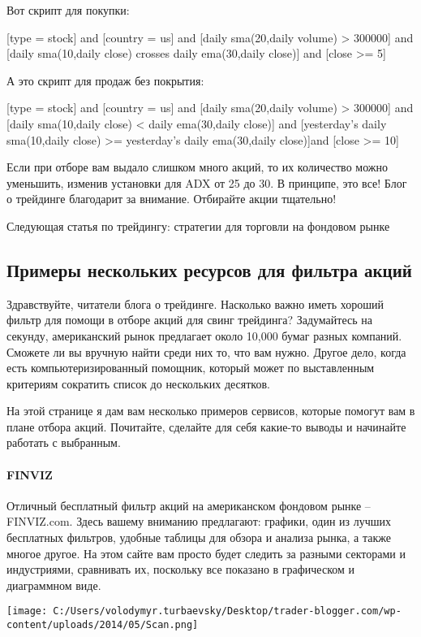 \documentclass[a5paper]{article}
\begin{document}
Вот скрипт для покупки:

[type = stock] and [country = us] and [daily sma(20,daily volume) > 300000] and
[daily sma(10,daily close) crosses daily ema(30,daily close)] and
[close >= 5]

А это скрипт для продаж без покрытия:

[type = stock] and [country = us] and [daily sma(20,daily volume) > 300000] and
[daily sma(10,daily close) < daily ema(30,daily close)] and
[yesterday's daily sma(10,daily close) >= yesterday's daily ema(30,daily close)]and
[close >= 10]

Если при отборе вам выдало слишком много акций, то их количество можно уменьшить, изменив установки для ADX от 25 до 30. В принципе, это все! Блог о трейдинге благодарит за внимание. Отбирайте акции тщательно!


Следующая статья по трейдингу: стратегии для торговли на фондовом
рынке

\subsection{Примеры нескольких ресурсов для фильтра акций}

Здравствуйте, читатели блога о трейдинге. Насколько важно иметь хороший фильтр для помощи в отборе акций для свинг трейдинга? Задумайтесь на секунду, американский рынок предлагает около 10,000 бумаг разных компаний. Сможете ли вы вручную найти среди них то, что вам нужно. Другое дело, когда есть компьютеризированный помощник, который может по выставленным критериям сократить список до нескольких десятков.

На этой странице я дам вам несколько примеров сервисов, которые
помогут вам в плане отбора акций. Почитайте, сделайте для себя
какие-то выводы и начинайте работать с выбранным.

\paragraph{FINVIZ}

Отличный бесплатный фильтр акций на американском фондовом рынке – FINVIZ.com. Здесь вашему вниманию предлагают: графики, один из лучших бесплатных фильтров, удобные таблицы для обзора и анализа рынка, а также многое другое. На этом сайте вам просто будет следить за разными секторами и индустриями, сравнивать их, поскольку все показано в графическом и диаграммном виде.

\texttt{[image: C:/Users/volodymyr.turbaevsky/Desktop/trader-blogger.com/wp-content/uploads/2014/05/Scan.png]}
\end{document}
